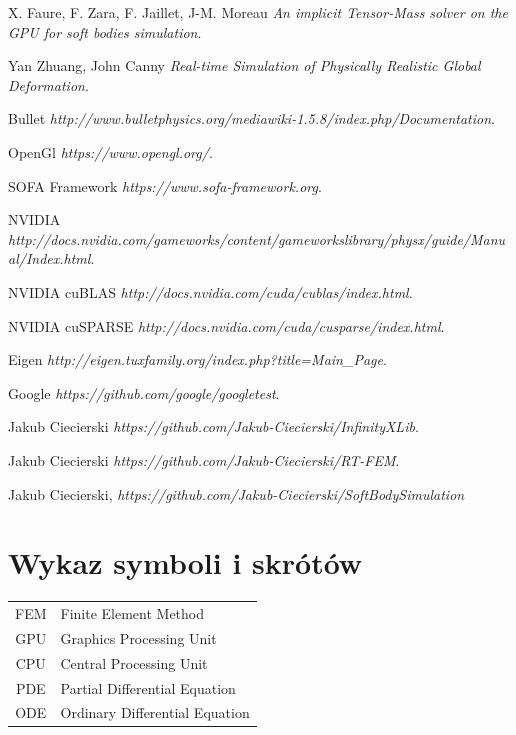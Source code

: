 \documentclass[en]{minipw} %
\begin{document}
\begin{thebibliography}{20}
 X. Faure, F. Zara, F. Jaillet, J-M. Moreau  \emph{An implicit Tensor-Mass solver on the GPU for soft bodies simulation}.

 Yan Zhuang, John Canny \emph{Real-time Simulation of Physically Realistic Global Deformation}.


 Bullet \emph{http://www.bulletphysics.org/mediawiki-1.5.8/index.php/Documentation}.

 OpenGl \emph{https://www.opengl.org/}.

 SOFA Framework \emph{https://www.sofa-framework.org}.

 NVIDIA \emph{http://docs.nvidia.com/gameworks/content/gameworkslibrary/physx/guide/Manual/Index.html}.

 NVIDIA cuBLAS \emph{http://docs.nvidia.com/cuda/cublas/index.html}.

 NVIDIA cuSPARSE \emph{http://docs.nvidia.com/cuda/cusparse/index.html}.

 Eigen \emph{http://eigen.tuxfamily.org/index.php?title=Main\_Page}.

 Google \emph{https://github.com/google/googletest}.


 Jakub Ciecierski \emph{https://github.com/Jakub-Ciecierski/InfinityXLib}.

 Jakub Ciecierski \emph{https://github.com/Jakub-Ciecierski/RT-FEM}.

 Jakub Ciecierski, \emph{https://github.com/Jakub-Ciecierski/SoftBodySimulation}


\end{thebibliography}

\chapter*{Wykaz symboli i skrótów}

\begin{tabular}{cl}
FEM & Finite Element Method \\
GPU & Graphics Processing Unit \\
CPU & Central Processing Unit \\
PDE & Partial Differential Equation \\
ODE & Ordinary Differential Equation \\
\end{tabular}
\end{document}
